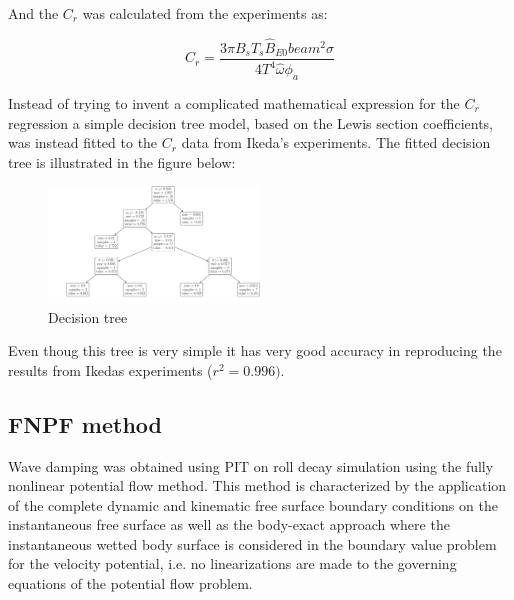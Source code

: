     

    And the $C_r$ was calculated from the experiments as:
 
            
    
    \begin{equation}
C_{r} = \frac{3 \pi B_{s} T_{s} \hat{B}_{E0} beam^{2} \sigma}{4 T^{4} \hat{\omega} \phi_{a}}
\label{eq:equation}
\end{equation}

    

    Instead of trying to invent a complicated mathematical expression for
the $C_r$ regression a simple decision tree model, based on the Lewis
section coefficients, was instead fitted to the $C_r$ data from
Ikeda's experiments. The fitted decision tree is illustrated in the
figure below:

    \begin{figure}[H]
        \begin{center}\includegraphics[width = 0.5\textwidth]{figures/decision_tree.pdf}\end{center}
        \vspace{-1cm}
        \caption{Decision tree}
        \label{fig:decision_tree}
    \end{figure}
    
    Even thoug this tree is very simple it has very good accuracy in
reproducing the results from Ikedas experiments ($r^2=0.996)$.

    \subsection*{FNPF method}\label{fnpf-method}

\label{fnpf-method} Wave damping was obtained using PIT on roll decay
simulation using the fully nonlinear potential flow method. This method
is characterized by the application of the complete dynamic and
kinematic free surface boundary conditions on the instantaneous free
surface as well as the body-exact approach where the instantaneous
wetted body surface is considered in the boundary value problem for the
velocity potential, i.e. no linearizations are made to the governing
equations of the potential flow problem.

